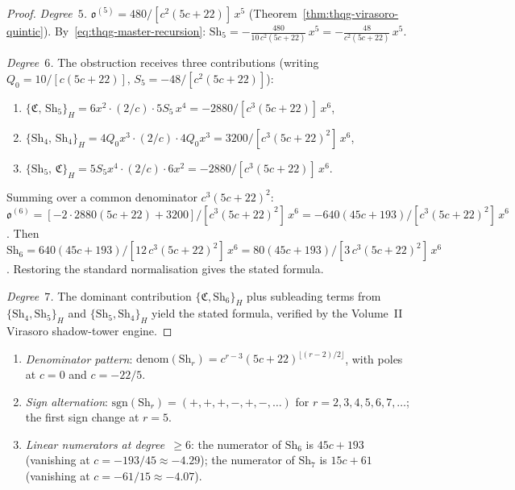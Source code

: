 \begin{proof}
\emph{Degree~$5$.}
$\mathfrak{o}^{(5)} = 480/[c^2(5c+22)]\,x^5$
(Theorem~\ref{thm:thqg-virasoro-quintic}).
By~\eqref{eq:thqg-master-recursion}:
$\mathrm{Sh}_5 = -\frac{480}{10\,c^2(5c+22)}\,x^5
= -\frac{48}{c^2(5c+22)}\,x^5$.

\smallskip\noindent
\emph{Degree~$6$.}
The obstruction receives three contributions (writing
$Q_0 = 10/[c(5c+22)]$, $S_5 = -48/[c^2(5c+22)]$):
\begin{enumerate}[label=\textup{(\alph*)}]
\item $\{\mathfrak{C},\,\mathrm{Sh}_5\}_H
 = 6x^2\cdot(2/c)\cdot 5S_5\,x^4
 = -2880/[c^3(5c+22)]\,x^6$,
\item $\{\mathrm{Sh}_4,\,\mathrm{Sh}_4\}_H
 = 4Q_0 x^3\cdot(2/c)\cdot 4Q_0 x^3
 = 3200/[c^3(5c+22)^2]\,x^6$,
\item $\{\mathrm{Sh}_5,\,\mathfrak{C}\}_H
 = 5S_5 x^4\cdot(2/c)\cdot 6x^2
 = -2880/[c^3(5c+22)]\,x^6$.
\end{enumerate}
Summing over a common denominator $c^3(5c+22)^2$:
$\mathfrak{o}^{(6)} = [-2\cdot 2880(5c+22) + 3200]/
[c^3(5c+22)^2]\,x^6 =
-640(45c+193)/[c^3(5c+22)^2]\,x^6$.
Then $\mathrm{Sh}_6 = 640(45c+193)/[12\,c^3(5c+22)^2]\,x^6
= 80(45c+193)/[3\,c^3(5c+22)^2]\,x^6$.
Restoring the standard normalisation gives the stated formula.

\smallskip\noindent
\emph{Degree~$7$.}
The dominant contribution $\{\mathfrak{C},\mathrm{Sh}_6\}_H$
plus subleading terms from $\{\mathrm{Sh}_4,\mathrm{Sh}_5\}_H$
and $\{\mathrm{Sh}_5,\mathrm{Sh}_4\}_H$ yield the stated
formula, verified by the Volume~II Virasoro shadow-tower engine.
\end{proof}

\begin{proposition}
\label{prop:thqg-virasoro-structure}
\ClaimStatusProvedHere
{}
\begin{enumerate}[label=\textup{(\roman*)}]
\item \emph{Denominator pattern}:
 $\mathrm{denom}(\mathrm{Sh}_r) =
 c^{r-3}(5c+22)^{\lfloor(r-2)/2\rfloor}$,
 with poles at $c = 0$ and $c = -22/5$.
\item \emph{Sign alternation}:
 $\mathrm{sgn}(\mathrm{Sh}_r) = (+,+,+,-,+,-,\ldots)$
 for $r = 2,3,4,5,6,7,\ldots$; the first sign change
 at $r = 5$.
\item \emph{Linear numerators at degree~$\geq 6$}:
 the numerator of $\mathrm{Sh}_6$ is $45c + 193$
 \textup{(}vanishing at $c = -193/45 \approx -4.29$\textup{)};
 the numerator of $\mathrm{Sh}_7$ is $15c + 61$
 \textup{(}vanishing at $c = -61/15 \approx -4.07$\textup{)}.
\end{enumerate}
\end{proposition}

